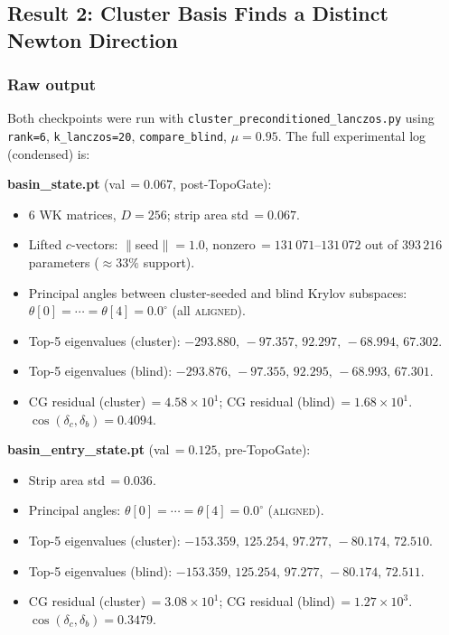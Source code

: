\documentclass[11pt]{amsart}
\begin{document}
\subsection{Result 2: Cluster Basis Finds a Distinct Newton Direction}
\label{sec:cluster_precond}

\subsubsection*{Raw output}

Both checkpoints were run with \texttt{cluster\_preconditioned\_lanczos.py}
using \texttt{rank=6}, \texttt{k\_lanczos=20}, \texttt{compare\_blind},
$\mu = 0.95$.
The full experimental log (condensed) is:

\medskip
\noindent\textbf{basin\_state.pt} (val\,$= 0.067$, post-TopoGate):
\begin{itemize}\setlength\itemsep{2pt}
\item 6 WK matrices, $D=256$; strip area std\,$= 0.067$.
\item Lifted $c$-vectors: $\|$seed$\| = 1.0$, nonzero\,$= 131\,071$--$131\,072$
  out of $393\,216$ parameters ($\approx 33\%$ support).
\item Principal angles between cluster-seeded and blind Krylov subspaces:
  $\theta[0] = \cdots = \theta[4] = 0.0^\circ$ (all \textsc{aligned}).
\item Top-5 eigenvalues (cluster): $-293.880,\,-97.357,\,92.297,\,-68.994,\,67.302$.
\item Top-5 eigenvalues (blind): $-293.876,\,-97.355,\,92.295,\,-68.993,\,67.301$.
\item CG residual (cluster)\,$= 4.58\times10^1$;
  CG residual (blind)\,$= 1.68\times10^1$.
  $\cos(\delta_c, \delta_b) = 0.4094$.
\end{itemize}

\noindent\textbf{basin\_entry\_state.pt} (val\,$= 0.125$, pre-TopoGate):
\begin{itemize}\setlength\itemsep{2pt}
\item Strip area std\,$= 0.036$.
\item Principal angles: $\theta[0] = \cdots = \theta[4] = 0.0^\circ$ (\textsc{aligned}).
\item Top-5 eigenvalues (cluster): $-153.359,\,125.254,\,97.277,\,-80.174,\,72.510$.
\item Top-5 eigenvalues (blind): $-153.359,\,125.254,\,97.277,\,-80.174,\,72.511$.
\item CG residual (cluster)\,$= 3.08\times10^1$;
  CG residual (blind)\,$= 1.27\times10^3$.
  $\cos(\delta_c, \delta_b) = 0.3479$.
\end{itemize}
\end{document}
